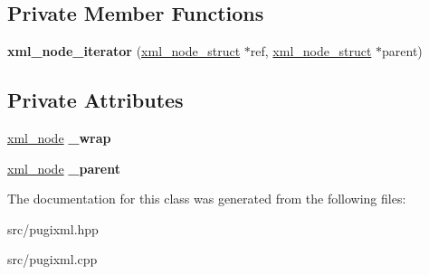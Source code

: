 \subsection*{Private Member Functions}
\begin{DoxyCompactItemize}
\item 
\mbox{\label{classpugi_1_1xml__node__iterator_a4a9cbadd201c68a9a69b5f5667500766}} 
{\bfseries xml\+\_\+node\+\_\+iterator} (\hyperlink{structpugi_1_1xml__node__struct}{xml\+\_\+node\+\_\+struct} $\ast$ref, \hyperlink{structpugi_1_1xml__node__struct}{xml\+\_\+node\+\_\+struct} $\ast$parent)
\end{DoxyCompactItemize}
\subsection*{Private Attributes}
\begin{DoxyCompactItemize}
\item 
\mbox{\label{classpugi_1_1xml__node__iterator_a909e81ef45f8df17b5a6edccf8bb8de0}} 
\hyperlink{classpugi_1_1xml__node}{xml\+\_\+node} {\bfseries \+\_\+wrap}
\item 
\mbox{\label{classpugi_1_1xml__node__iterator_a84adb1e1576c0fdacb3d125c8c4e3941}} 
\hyperlink{classpugi_1_1xml__node}{xml\+\_\+node} {\bfseries \+\_\+parent}
\end{DoxyCompactItemize}


The documentation for this class was generated from the following files\+:\begin{DoxyCompactItemize}
\item 
src/pugixml.\+hpp\item 
src/pugixml.\+cpp\end{DoxyCompactItemize}
